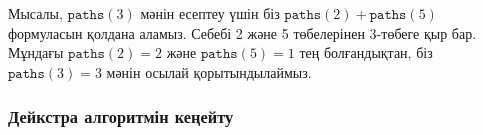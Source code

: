 Мысалы, $\texttt{paths}(3)$ мәнін есептеу үшін біз 
$\texttt{paths}(2)+\texttt{paths}(5)$ формуласын қолдана аламыз.
Себебі 2 және 5 төбелерінен 3-төбеге қыр бар.
Мұндағы $\texttt{paths}(2)=2$ және $\texttt{paths}(5)=1$ тең болғандықтан,
біз $\texttt{paths}(3)=3$ мәнін осылай қорытындылаймыз.


\subsubsection{Дейкстра алгоритмін кеңейту}


